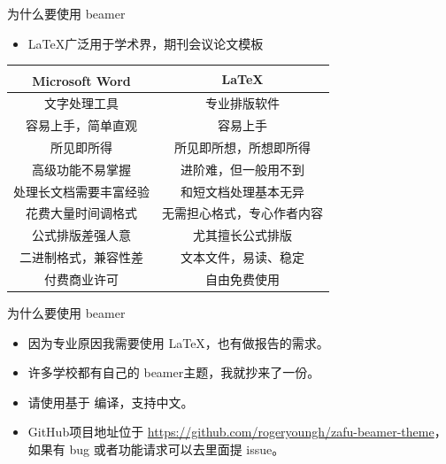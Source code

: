 \documentclass{ctexbeamer}
\newcommand\murl[1]{{\color{linkcolor} \url{#1}}}
\begin{document}
\begin{frame}{为什么要使用 beamer}
	\begin{itemize}
		\item \LaTeX 广泛用于学术界，期刊会议论文模板
	\end{itemize}
	\begin{table}[h]
		\centering
		\begin{tabular}{c|c}
			Microsoft\textsuperscript{\textregistered}  Word & \LaTeX        \\
			\hline
			文字处理工具                                           & 专业排版软件        \\
			容易上手，简单直观                                        & 容易上手          \\
			所见即所得                                            & 所见即所想，所想即所得   \\
			高级功能不易掌握                                         & 进阶难，但一般用不到    \\
			处理长文档需要丰富经验                                      & 和短文档处理基本无异    \\
			花费大量时间调格式                                        & 无需担心格式，专心作者内容 \\
			公式排版差强人意                                         & 尤其擅长公式排版      \\
			二进制格式，兼容性差                                       & 文本文件，易读、稳定    \\
			付费商业许可                                           & 自由免费使用        \\
		\end{tabular}
	\end{table}
\end{frame}

\begin{frame}{为什么要使用 beamer}
	\begin{itemize} %
		\item 因为专业原因我需要使用 \LaTeX{}，也有做报告的需求。
		\item 许多学校都有自己的 beamer主题，我就抄来了一份。 \pause
		\item 请使用基于 编译，支持中文。
		\item GitHub项目地址位于 \murl{https://github.com/rogeryoungh/zafu-beamer-theme}，如果有 bug 或者功能请求可以去里面提 issue。
	\end{itemize}
\end{frame}
\end{document}
